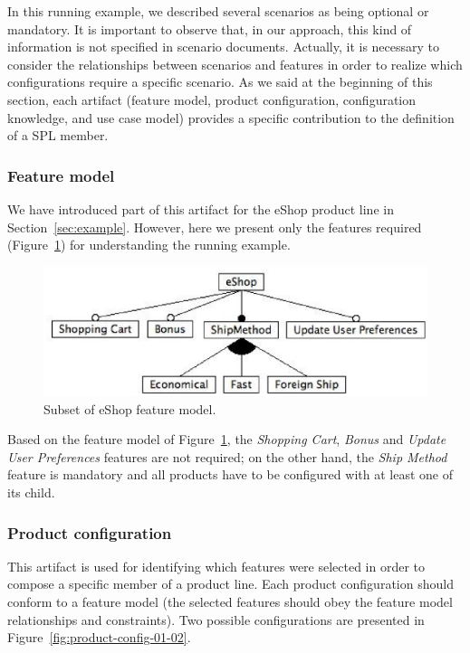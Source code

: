 \documentclass{acm_proc_article-sp}
\begin{document}
In this running example, we described several scenarios as being optional or mandatory. It is important to observe that, in our approach, this kind of information is not specified in scenario documents. Actually, it is necessary to consider the relationships between scenarios and features in order to realize which configurations require a specific scenario. As we said at the beginning of this section, each artifact (feature model, product configuration, configuration knowledge, and use case model) provides a specific contribution to the definition of a SPL member. 

\subsubsection{Feature model}

We have introduced part of this artifact for the eShop product line in Section~\ref{sec:example}. However, here we 
present only the features required  (Figure~\ref{fig:eshop-fm-re}) for understanding the running example. 

 \begin{figure}[h]
 \begin{center}
  \includegraphics[scale=0.40]{img/eShop-fm-re.eps}
   \caption{Subset of eShop feature model.}
  \label{fig:eshop-fm-re}
  \end{center}
\end{figure}

Based on the feature model of Figure~\ref{fig:eshop-fm-re}, the \emph{Shopping 
Cart}, \emph{Bonus} and \emph{Update User Preferences} features are not required; on the other hand, the \emph{Ship Method} feature is mandatory and all products have to be configured with at least one of its child.  

\subsubsection{Product configuration}

This artifact is used for identifying which features were selected in order to compose a specific member of a product line. Each product configuration should conform to a feature model (the selected features should obey the feature model relationships and constraints). Two possible configurations are presented in Figure~\ref{fig:product-config-01-02}.  
\end{document}
